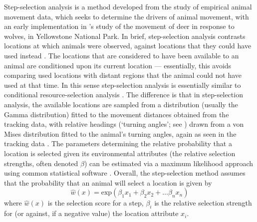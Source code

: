 \begin{tcolorbox}[width=\textwidth,
    boxsep=0pt,
    left=0pt,
    right=0pt,
    top=2pt,
    arc=0pt,
    boxrule=0.0pt,
    toprule=1pt,
    bottomrule=1pt,
    colback=white
    ]%
    \begin{description}[font=\scshape\bfseries]
        \item[Box A. Step-selection Analysis: An Introduction] Step-selection analysis is a method developed from the study of empirical animal movement data, which seeks to determine the drivers of animal movement, with an early implementation in \textcite{fortin2005}'s study of the movement of deer in response to wolves, in Yellowstone National Park.
        In brief, step-selection analysis contrasts locations at which animals were observed, against locations that they could have used instead \parencite[][]{fortin2005}.
        The locations that are considered to have been available to an animal are conditioned upon its current location --- essentially, this avoids comparing used locations with distant regions that the animal could not have used at that time.
        In this sense step-selection analysis is essentially similar to conditional resource-selection analysis \parencite[see as general reference][]{manly2007}.
        The difference is that in step-selection analysis, the available locations are sampled from a distribution (usually the Gamma distribution) fitted to the movement distances obtained from the tracking data, with relative headings (`turning angles'; see \cite{calenge2009}) drawn from a von Mises distribution fitted to the animal's turning angles, again as seen in the tracking data \parencite[][]{thurfjell2014,signer2019}.
        The parameters determining the relative probability that a location is selected given its environmental attributes (the relative selection strengths, often denoted $\beta$) can be estimated via a maximum likelihood approach using common statistical software \parencite[see e.g. for R][]{therneau2000}.
        Overall, the step-selection method assumes that the probability that an animal will select a location is given by
        $$
            \hat{w}(x) = \text{exp}(\beta_1x_1 + \beta_2x_2 + \ldots \beta_nx_n)
        $$
        where $\hat{w}(x)$ is the selection score for a step, $\beta_i$ is the relative selection strength for (or against, if a negative value) the location attribute $x_i$.
    \end{description}
\end{tcolorbox}

